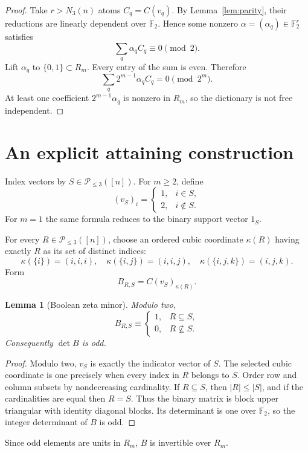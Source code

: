 \documentclass[11pt]{article}
\newtheorem{lemma}[theorem]{Lemma}
\theoremstyle{definition}
\newcommand{\F}{\mathbb F}
\begin{document}
\begin{proof}
Take \(r>N_3(n)\) atoms \(C_q=C(v_q)\). By Lemma~\ref{lem:parity}, their reductions are linearly dependent over \(\F_2\). Hence some nonzero \(\alpha=(\alpha_q)\in\F_2^r\) satisfies
\[
\sum_q\alpha_q C_q\equiv0\pmod2.
\]
Lift \(\alpha_q\) to \(\{0,1\}\subset R_m\). Every entry of the sum is even. Therefore
\[
\sum_q2^{m-1}\alpha_q C_q=0\pmod{2^m}.
\]
At least one coefficient \(2^{m-1}\alpha_q\) is nonzero in \(R_m\), so the dictionary is not free independent.
\end{proof}

\section{An explicit attaining construction}
Index vectors by \(S\in\mathcal P_{\le3}([n])\). For \(m\ge2\), define
\[
(v_S)_i=
\begin{cases}
1,&i\in S,\\
2,&i\notin S.
\end{cases}
\]
For \(m=1\) the same formula reduces to the binary support vector \(1_S\).

For every \(R\in\mathcal P_{\le3}([n])\), choose an ordered cubic coordinate \(\kappa(R)\) having exactly \(R\) as its set of distinct indices:
\[
\kappa(\{i\})=(i,i,i),\quad
\kappa(\{i,j\})=(i,i,j),\quad
\kappa(\{i,j,k\})=(i,j,k).
\]
Form
\[
B_{R,S}=C(v_S)_{\kappa(R)}.
\]

\begin{lemma}[Boolean zeta minor]\label{lem:zeta}
Modulo two,
\[
B_{R,S}\equiv
\begin{cases}
1,&R\subseteq S,\\
0,&R\nsubseteq S.
\end{cases}
\]
Consequently \(\det B\) is odd.
\end{lemma}

\begin{proof}
Modulo two, \(v_S\) is exactly the indicator vector of \(S\). The selected cubic coordinate is one precisely when every index in \(R\) belongs to \(S\). Order row and column subsets by nondecreasing cardinality. If \(R\subseteq S\), then \(|R|\le|S|\), and if the cardinalities are equal then \(R=S\). Thus the binary matrix is block upper triangular with identity diagonal blocks. Its determinant is one over \(\F_2\), so the integer determinant of \(B\) is odd.
\end{proof}

Since odd elements are units in \(R_m\), \(B\) is invertible over \(R_m\).
\end{document}
